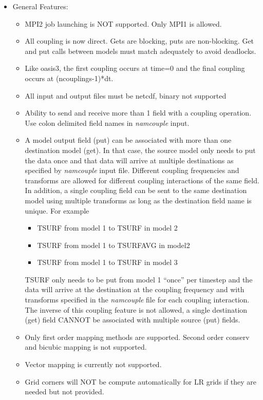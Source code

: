 \begin{itemize}

\item General Features:

\begin{itemize}
\item MPI2 job launching is NOT supported.  Only MPI1 is allowed.
\item All coupling is now direct.  Gets are blocking, puts are 
  non-blocking.  Get and put calls between models must match
  adequately to avoid deadlocks.
\item Like oasis3, the first coupling occurs at time=0 and the
  final coupling occurs at (ncouplings-1)*dt.
\item All input and output files must be netcdf, binary not supported
\item Ability to send and receive more than 1 field with a coupling
  operation.  Use colon delimited field names in {\it namcouple} input.
\item A model output field (put) can be associated with more than one
  destination model (get).  In that case, the source model only
  needs to put the data once and that data will arrive at multiple
  destinations as specified by {\it namcouple} input file.  Different
  coupling frequencies and transforms are allowed for different
  coupling interactions of the same field.  In addition, a single
  coupling field can be sent to the same destination model using
  multiple transforms as long as the destination field name is
  unique.  For example
\begin{itemize}
\item    TSURF from model 1 to TSURF in model 2
\item    TSURF from model 1 to TSURFAVG in model2
\item    TSURF from model 1 to TSURF in model 3 
\end{itemize}
  TSURF only needs to be put from model 1 ``once'' per timestep and
  the data will arrive at the destination at the coupling
  frequency and with transforms specified in the {\it namcouple} file
  for each coupling interaction.
  The inverse of this coupling feature is not allowed, a single
  destination (get) field CANNOT be associated with multiple source (put)
  fields.
\item Only first order mapping methods are supported.  Second order
  conserv and bicubic mapping is not supported.
\item Vector mapping is currently not supported.
\item Grid corners will NOT be compute automatically for LR grids if they are
  needed but not provided.
\end{itemize}


\end{itemize}
